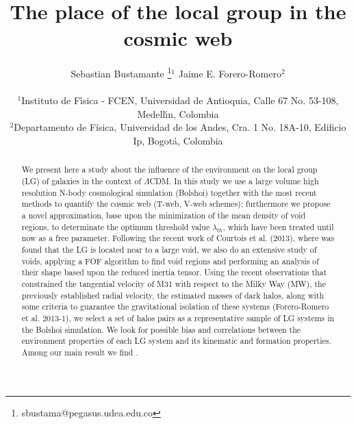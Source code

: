 \documentclass[usenatbib]{latex/mn2e}
\begin{document}
\title[LG Environment]{The place of the local group in the cosmic web}
\author[S. Bustamante and J.E. Forero-Romero]{
\parbox[t]{\textwidth}{\raggedright 
  Sebastian Bustamante \thanks{sbustama@pegasus.udea.edu.co}$^{1}$ 
  Jaime E. Forero-Romero$^{2}$ 
}
\vspace*{6pt}\\
$^1$Instituto de F\'{\i}sica - FCEN, Universidad de Antioquia, Calle
67 No. 53-108, Medell\'{\i}n, Colombia\\ 
$^2$Departamento de F\'{i}sica, Universidad de los Andes, Cra. 1
No. 18A-10, Edificio Ip, Bogot\'a, Colombia
}

\maketitle

\begin{abstract}


We present here a study about the influence of the environment on the
local group (LG) of galaxies in the context of $\Lambda$CDM. In this study 
we use a large volume high resolution N-body cosmological simulation 
(Bolshoi) together with the most recent methods to quantify the cosmic web 
(T-web, V-web schemes); furthermore we propose a novel approximation, base
upon the minimization of the mean density of void regions, to determinate 
the optimum threshold value $\lambda_{th}$, which have been treated until 
now as a free parameter. 
Following the recent work of Courtois et al. (2013), where was 
found that the LG is located near to a large void, we also do an extensive 
study of voids, applying a FOF algorithm to find void regions and 
performing an analysis of their shape based upon the reduced inertia 
tensor.
Using the recent observations that constrained the tangential velocity of
M31 with respect to the Milky Way (MW), the previously established radial 
velocity, the estimated masses of dark halos, along with some criteria
to guarantee the gravitational isolation of these systems (Forero-Romero
et al. 2013-1), we select a set of halos pairs as a representative sample 
of LG systems in the Bolshoi simulation. 
We look for possible bias and correlations between the environment 
properties of each LG system and its kinematic and formation properties. 
Among our main result we find .

\end{abstract}
\end{document}
